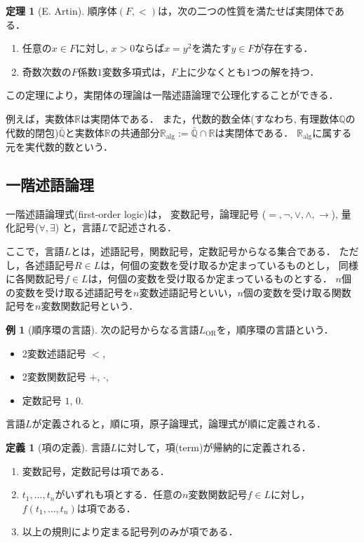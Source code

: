\documentclass[uplatex, dvipdfmx]{jsarticle}
\newcommand{\R}{\mathbb{R}}
\newcommand{\Q}{\mathbb{Q}}
\newcommand{\Ralg}{\mathbb{R}_\mathrm{alg}}
\theoremstyle{definition}
\newtheorem{definition}{定義}[section]
\newtheorem{theorem}{定理}[section]
\newtheorem{example}{例}[section]
\begin{document}
\begin{theorem}[E. Artin]
     順序体$(F,<)$は，次の二つの性質を満たせば実閉体である．
     \begin{enumerate}
          \item 任意の$x \in F$に対し, $x>0$ならば$x = y^2$を満たす$y \in F$が存在する．
          \item 奇数次数の$F$係数$1$変数多項式は，$F$上に少なくとも$1$つの解を持つ．
     \end{enumerate}
\end{theorem}

この定理により，実閉体の理論は一階述語論理で公理化することができる．

例えば，実数体$\R$は実閉体である．
また，代数的数全体(すなわち, 有理数体$\Q$の代数的閉包)$\bar{\Q}$と実数体$\R$の共通部分$\Ralg := \bar{\Q} \cap \R$は実閉体である．
$\Ralg$に属する元を実代数的数という．

\subsection{一階述語論理}
一階述語論理式(first-order logic)は，
変数記号，論理記号 ($=, \lnot, \lor, \land, \rightarrow$), 量化記号($\forall, \exists$)
と，言語$L$で記述される．

ここで，言語$L$とは，述語記号，関数記号，定数記号からなる集合である．
ただし，各述語記号$R \in L$は，何個の変数を受け取るか定まっているものとし，
同様に各関数記号$f \in L$は，何個の変数を受け取るか定まっているものとする．
$n$個の変数を受け取る述語記号を$n$変数述語記号といい，$n$個の変数を受け取る関数記号を$n$変数関数記号という．

\begin{example}[順序環の言語]
     次の記号からなる言語$L_\mathrm{OR}$を，順序環の言語という．
     \begin{itemize}
          \item 2変数述語記号 $<$,
          \item 2変数関数記号 $+$, $\cdot$,
          \item 定数記号 $1$, $0$.
     \end{itemize}
\end{example}

言語$L$が定義されると，順に項，原子論理式，論理式が順に定義される．

\begin{definition}[項の定義]
     言語$L$に対して，項(term)が帰納的に定義される．
     \begin{enumerate}
          \item 変数記号，定数記号は項である．
          \item $t_1, \dots, t_n$がいずれも項とする．任意の$n$変数関数記号$f \in L$に対し，$f(t_1, \dots, t_n)$は項である．
          \item 以上の規則により定まる記号列のみが項である．
     \end{enumerate}
\end{definition}
\end{document}
